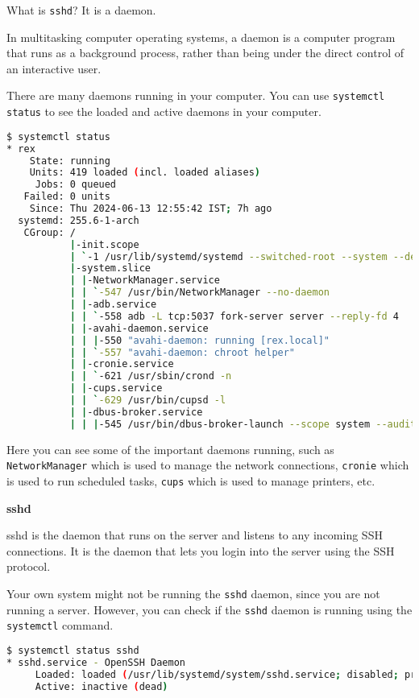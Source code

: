 What is \lstinline|sshd|?
It is a daemon.

\begin{definition}[Daemon]
  In multitasking computer operating systems, a daemon
  is a computer program that runs as a background process,
  rather than being under the direct control of an
  interactive user.
\end{definition}

There are many daemons running in your computer.
You can use \lstinline|systemctl status| to see the
loaded and active daemons in your computer.

\begin{lstlisting}[language=bash]
$ systemctl status
* rex
    State: running
    Units: 419 loaded (incl. loaded aliases)
     Jobs: 0 queued
   Failed: 0 units
    Since: Thu 2024-06-13 12:55:42 IST; 7h ago
  systemd: 255.6-1-arch
   CGroup: /
           |-init.scope
           | `-1 /usr/lib/systemd/systemd --switched-root --system --deserialize=43
           |-system.slice
           | |-NetworkManager.service
           | | `-547 /usr/bin/NetworkManager --no-daemon
           | |-adb.service
           | | `-558 adb -L tcp:5037 fork-server server --reply-fd 4
           | |-avahi-daemon.service
           | | |-550 "avahi-daemon: running [rex.local]"
           | | `-557 "avahi-daemon: chroot helper"
           | |-cronie.service
           | | `-621 /usr/sbin/crond -n
           | |-cups.service
           | | `-629 /usr/bin/cupsd -l
           | |-dbus-broker.service
           | | |-545 /usr/bin/dbus-broker-launch --scope system --audit
\end{lstlisting}

Here you can see some of the important daemons running,
such as \lstinline|NetworkManager| which is used to manage
the network connections, \lstinline|cronie| which is used
to run scheduled tasks, \lstinline|cups| which is used to
manage printers, etc.

\textbf{sshd}

sshd is the daemon that runs on the server and listens
to any incoming SSH connections. It is the daemon that
lets you login into the server using the SSH protocol.

Your own system might not be running the \lstinline|sshd|
daemon, since you are not running a server. However,
you can check if the \lstinline|sshd| daemon is running
using the \lstinline|systemctl| command.

\begin{lstlisting}[language=bash]
$ systemctl status sshd
* sshd.service - OpenSSH Daemon
     Loaded: loaded (/usr/lib/systemd/system/sshd.service; disabled; preset: disabled)
     Active: inactive (dead)
\end{lstlisting}

